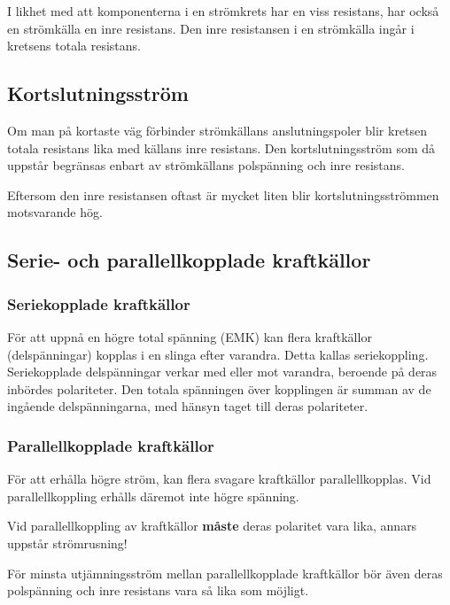 I likhet med att komponenterna i en strömkrets har en viss resistans, har också en
strömkälla en inre resistans.
Den inre resistansen i en strömkälla ingår i kretsens totala resistans.

\subsection{Kortslutningsström}

Om man på kortaste väg förbinder strömkällans anslutningspoler blir kretsen
totala resistans lika med källans inre resistans. Den kortslutningsström som då uppstår begränsas enbart av strömkällans polspänning och inre resistans.

Eftersom den inre resistansen oftast är mycket liten blir kortslutningsströmmen
motsvarande hög.

\subsection{Serie- och parallellkopplade kraftkällor}

\subsubsection{Seriekopplade kraftkällor}

För att uppnå en högre total spänning (EMK) kan flera kraftkällor
(delspänningar) kopplas i en slinga efter varandra. Detta kallas
seriekoppling.  Seriekopplade delspänningar verkar med eller mot
varandra, beroende på deras inbördes polariteter. Den totala
spänningen över kopplingen är summan av de ingående delspänningarna,
med hänsyn taget till deras polariteter.

\subsubsection{Parallellkopplade kraftkällor}


För att erhålla högre ström, kan flera svagare kraftkällor parallellkopplas.
Vid parallellkoppling erhålls däremot inte högre spänning.

Vid parallellkoppling av kraftkällor \textbf{måste} deras polaritet
vara lika, annars uppstår strömrusning!

För minsta utjämningsström mellan parallellkopplade kraftkällor bör även deras
polspänning och inre resistans vara så lika som möjligt.
